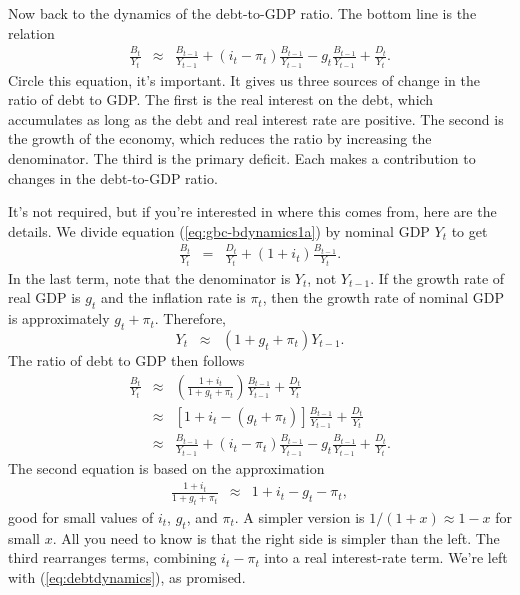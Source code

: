 Now back to the dynamics of the debt-to-GDP ratio.
The bottom line is the relation
\begin{eqnarray}
    \frac{B_{t}}{Y_{t}}
            &\approx&
                \frac{B_{t-1}}{Y_{t-1}} + (i_t-\pi_t) \frac{B_{t-1}}{Y_{t-1}}
                - g_t \frac{B_{t-1}}{Y_{t-1}}
             +    \frac{D_{t}}{Y_{t}}  .
    \label{eq:debtdynamics}
\end{eqnarray}
Circle this equation, it's important.
It gives us three sources
of change in the ratio of debt to GDP.
The first is the real interest on the debt, which accumulates
as long as the debt and real interest rate are positive.
The second is the growth of the economy,
which reduces the ratio by increasing the denominator.
The third is the primary deficit.
Each makes a contribution to changes in the debt-to-GDP ratio.


It's not required, but if you're interested in where this comes from,
here are the details.
We divide equation (\ref{eq:gbc-bdynamics1a}) by nominal GDP $Y_t$ to get
\begin{eqnarray*}
    \frac{B_{t}}{Y_{t}} &=& %
            \frac{D_{t}}{Y_{t}}
            +  (1+i_t) \frac{B_{t-1}}{Y_{t}}  .
\end{eqnarray*}
In the last term, note that the denominator is $Y_t$, not $Y_{t-1}$.
If the growth rate of real GDP is $g_t$ and the inflation rate is $\pi_t$,
then the growth rate of nominal GDP is approximately $g_t + \pi_t$.
Therefore,
\[
    Y_{t} \;\;\approx\;\; (1+g_t+\pi_t) Y_{t-1}.
\]
The ratio of debt to GDP then follows
\begin{eqnarray*}
    \frac{B_{t}}{Y_{t}}
            &\approx&
                \left( \frac{1+i_t}{1+g_t+\pi_t} \right)  \frac{B_{t-1}}{Y_{t-1}}
             +    \frac{D_{t}}{Y_{t}}  \nonumber \\
            &\approx&
                \left[ 1 + i_t - (g_t+\pi_t) \right]  \frac{B_{t-1}}{Y_{t-1}}
             +    \frac{D_{t}}{Y_{t}}   \nonumber \\
            &\approx&
                \frac{B_{t-1}}{Y_{t-1}} + (i_t-\pi_t) \frac{B_{t-1}}{Y_{t-1}}
                - g_t \frac{B_{t-1}}{Y_{t-1}}
             +    \frac{D_{t}}{Y_{t}}  .
\end{eqnarray*}
The second equation is based on the approximation
\begin{eqnarray*}
    \frac{1+i_t}{1+g_t+\pi_t} &\approx& 1 + i_t - g_t - \pi_t ,
\end{eqnarray*}
good for small values of $i_t$, $g_t$, and $\pi_t$.
A simpler version is $1/(1+x) \approx 1-x $ for small $x$.  
All you need to know is that the right side is simpler than the left.
The third rearranges terms, combining $i_t-\pi_t$ into a real
interest-rate term.
We're left with (\ref{eq:debtdynamics}), as promised.


